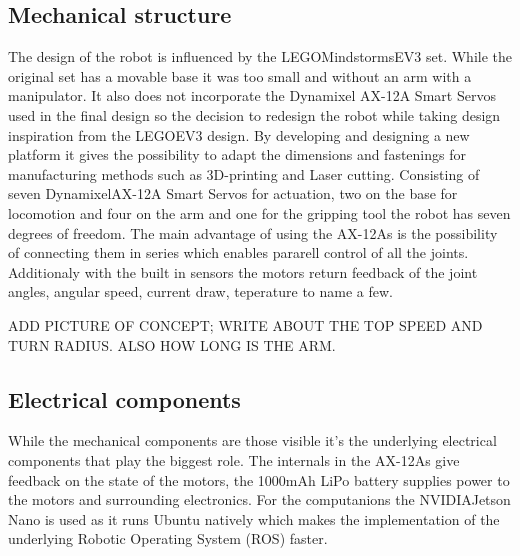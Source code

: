 
\subsection{Mechanical structure}
The design of the robot is influenced by the LEGO\textregistered Mindstorms\textregistered EV3 set. While the original set has a movable base it was too small and without an arm with a manipulator. It also does not incorporate the Dynamixel AX-12A Smart Servos used in the final design so the decision to redesign the robot while taking design inspiration from the LEGO\textregistered EV3 design. By developing and designing a new platform it gives the possibility to adapt the dimensions and fastenings for manufacturing methods such as 3D-printing and Laser cutting. 
Consisting of seven Dynamixel\textregistered AX-12A Smart Servos for actuation, two on the base for locomotion and four on the arm and one for the gripping tool the robot has seven degrees of freedom. The main advantage of using the AX-12As is the possibility of connecting them in series which enables pararell control of all the joints. Additionaly with the built in sensors the motors return feedback of the joint angles, angular speed, current draw, teperature to name a few. 

ADD PICTURE OF CONCEPT; WRITE ABOUT THE TOP SPEED AND TURN RADIUS. ALSO HOW LONG IS THE ARM.

\subsection{Electrical components}
While the mechanical components are those visible it's the underlying electrical components that play the biggest role. The internals in the AX-12As give feedback on the state of the motors, the 1000mAh LiPo battery supplies power to the motors and surrounding electronics. For the computanions the NVIDIA\textregistered Jetson Nano is used as it runs Ubuntu natively which makes the implementation of the underlying Robotic Operating System (ROS) \cite{ros} faster.



